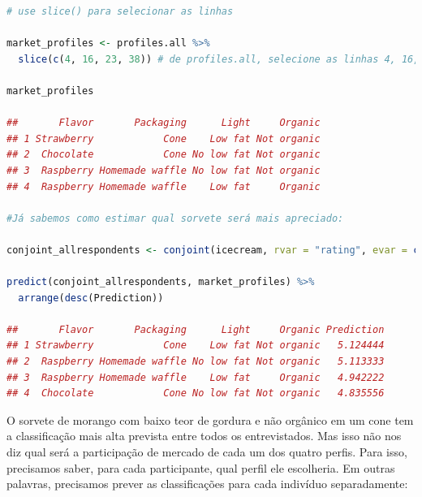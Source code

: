 \documentclass{article}
\begin{document}
\begin{lstlisting}[language=R]
# use slice() para selecionar as linhas 

market_profiles <- profiles.all %>% 
  slice(c(4, 16, 23, 38)) # de profiles.all, selecione as linhas 4, 16, 23, 38 como quatro profiles

market_profiles

##       Flavor       Packaging      Light     Organic
## 1 Strawberry            Cone    Low fat Not organic
## 2  Chocolate            Cone No low fat Not organic
## 3  Raspberry Homemade waffle No low fat Not organic
## 4  Raspberry Homemade waffle    Low fat     Organic

#Já sabemos como estimar qual sorvete será mais apreciado:

conjoint_allrespondents <- conjoint(icecream, rvar = "rating", evar = c("Flavor","Packaging","Light","Organic"))

predict(conjoint_allrespondents, market_profiles) %>%
  arrange(desc(Prediction))
  
##       Flavor       Packaging      Light     Organic Prediction
## 1 Strawberry            Cone    Low fat Not organic   5.124444
## 2  Raspberry Homemade waffle No low fat Not organic   5.113333
## 3  Raspberry Homemade waffle    Low fat     Organic   4.942222
## 4  Chocolate            Cone No low fat Not organic   4.835556
\end{lstlisting}

O sorvete de morango com baixo teor de gordura e não orgânico em um cone tem a classificação mais alta prevista entre todos os entrevistados. Mas isso não nos diz qual será a participação de mercado de cada um dos quatro perfis. Para isso, precisamos saber, para cada participante, qual perfil ele escolheria. Em outras palavras, precisamos prever as classificações para cada indivíduo separadamente:
\end{document}
